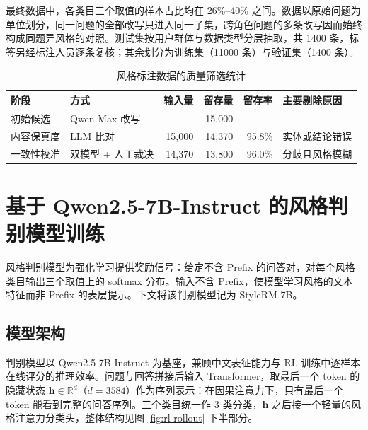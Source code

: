 \documentclass[fontset=fandol,type=master,campus=shenzhen,etitleauto=true]{hithesisbook}
\begin{document}
最终数据中，各类目三个取值的样本占比均在 26\%--40\% 之间。数据以原始问题为单位划分，同一问题的全部改写只进入同一子集，跨角色问题的多条改写因而始终构成同题异风格的对照。测试集按用户群体与数据类型分层抽取，共 1400 条，标签另经标注人员逐条复核；其余划分为训练集（11000 条）与验证集（1400 条）。

\begin{table}[htbp]
\centering
\caption{风格标注数据的质量筛选统计}
\label{tab:style-data-dist}
\small
\setlength{\tabcolsep}{5pt}
\renewcommand{\arraystretch}{1.15}
\begin{tabular}{l l r r r l}
\toprule
\textbf{阶段} & \textbf{方式} & \textbf{输入量} & \textbf{留存量} & \textbf{留存率} & \textbf{主要剔除原因} \\
\midrule
初始候选   & Qwen-Max 改写  &  ——   & 15{,}000 &  ——    &  —— \\
内容保真度 & LLM 比对 & 15{,}000 & 14{,}370 & 95.8\% & 实体或结论错误 \\
一致性校准 & 双模型 + 人工裁决 & 14{,}370 & 13{,}800 & 96.0\% & 分歧且风格模糊 \\
\bottomrule
\end{tabular}

\end{table}

\section{基于 Qwen2.5-7B-Instruct 的风格判别模型训练}\label{ux57faux4e8e-qwen2.5-7b-ux7684ux98ceux683cux5224ux522bux6a21ux578bux8badux7ec3}

风格判别模型为强化学习提供奖励信号：给定不含 Prefix 的问答对，对每个风格类目输出三个取值上的 softmax 分布。输入不含 Prefix，使模型学习风格的文本特征而非 Prefix 的表层提示。下文将该判别模型记为 StyleRM-7B。

\subsection{模型架构}\label{ux6a21ux578bux67b6ux6784ux8bbeux8ba1}

判别模型以 Qwen2.5-7B-Instruct 为基座，兼顾中文表征能力与 RL 训练中逐样本在线评分的推理效率。问题与回答拼接后输入 Transformer，取最后一个 token 的隐藏状态 $\mathbf{h} \in \mathbb{R}^{d}$（$d = 3584$）作为序列表示：在因果注意力下，只有最后一个 token 能看到完整的问答序列。三个类目统一作 3 类分类，$\mathbf{h}$ 之后接一个轻量的风格注意力分类头，整体结构见图 \ref{fig:rl-rollout} 下半部分。
\end{document}
